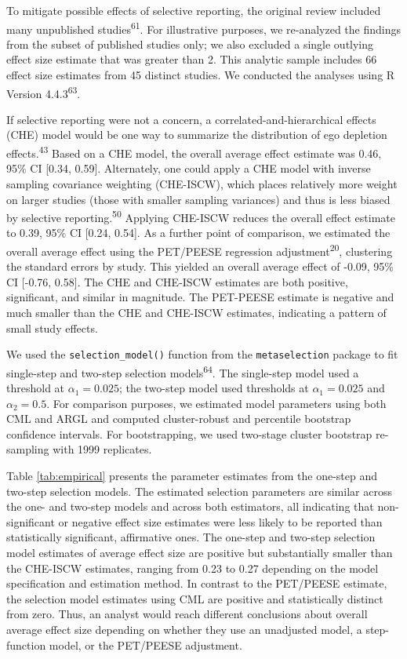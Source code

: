 \documentclass[
  american,
  man, donotrepeattitle,floatsintext]{apa7}
\begin{document}
To mitigate possible effects of selective reporting, the original review included many unpublished studies\textsuperscript{61}.
For illustrative purposes, we re-analyzed the findings from the subset of published studies only; we also excluded a single outlying effect size estimate that was greater than 2. This analytic sample includes 66 effect size estimates from 45 distinct studies.
We conducted the analyses using R Version 4.4.3\textsuperscript{63}.

If selective reporting were not a concern, a correlated-and-hierarchical effects (CHE) model would be one way to summarize the distribution of ego depletion effects.\textsuperscript{43}
Based on a CHE model, the overall average effect estimate was 0.46, 95\% CI {[}0.34, 0.59{]}.
Alternately, one could apply a CHE model with inverse sampling covariance weighting (CHE-ISCW), which places relatively more weight on larger studies (those with smaller sampling variances) and thus is less biased by selective reporting.\textsuperscript{50}
Applying CHE-ISCW reduces the overall effect estimate to 0.39, 95\% CI {[}0.24, 0.54{]}.
As a further point of comparison, we estimated the overall average effect using the PET/PEESE regression adjustment\textsuperscript{20}, clustering the standard errors by study. This yielded an overall average effect of -0.09, 95\% CI {[}-0.76, 0.58{]}. The CHE and CHE-ISCW estimates are both positive, significant, and similar in magnitude. The PET-PEESE estimate is negative and much smaller than the CHE and CHE-ISCW estimates, indicating a pattern of small study effects.

We used the \texttt{selection\_model()} function from the \texttt{metaselection} package to fit single-step and two-step selection models\textsuperscript{64}.
The single-step model used a threshold at \(\alpha_1 = 0.025\); the two-step model used thresholds at \(\alpha_1 = 0.025\) and \(\alpha_2 = 0.5\).
For comparison purposes, we estimated model parameters using both CML and ARGL and computed cluster-robust and percentile bootstrap confidence intervals.
For bootstrapping, we used two-stage cluster bootstrap re-sampling with 1999 replicates.

Table \ref{tab:empirical} presents the parameter estimates from the one-step and two-step selection models.
The estimated selection parameters are similar across the one- and two-step models and across both estimators, all indicating that non-significant or negative effect size estimates were less likely to be reported than statistically significant, affirmative ones.
The one-step and two-step selection model estimates of average effect size are positive but substantially smaller than the CHE-ISCW estimates, ranging from 0.23 to 0.27 depending on the model specification and estimation method.
In contrast to the PET/PEESE estimate, the selection model estimates using CML are positive and statistically distinct from zero.
Thus, an analyst would reach different conclusions about overall average effect size depending on whether they use an unadjusted model, a step-function model, or the PET/PEESE adjustment.
\end{document}
